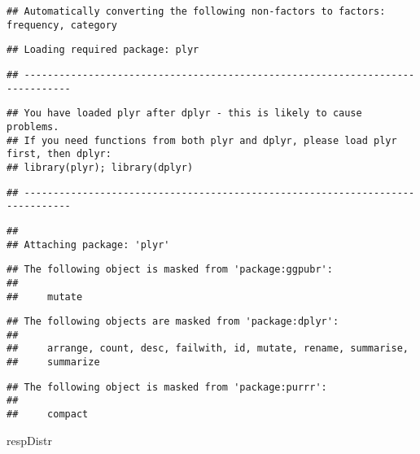 \documentclass[
]{article}
\newenvironment{Shaded}{\begin{snugshade}}{\end{snugshade}}
\newcommand{\NormalTok}[1]{#1}
\begin{document}
\begin{verbatim}
## Automatically converting the following non-factors to factors: frequency, category
\end{verbatim}

\begin{verbatim}
## Loading required package: plyr
\end{verbatim}

\begin{verbatim}
## ------------------------------------------------------------------------------
\end{verbatim}

\begin{verbatim}
## You have loaded plyr after dplyr - this is likely to cause problems.
## If you need functions from both plyr and dplyr, please load plyr first, then dplyr:
## library(plyr); library(dplyr)
\end{verbatim}

\begin{verbatim}
## ------------------------------------------------------------------------------
\end{verbatim}

\begin{verbatim}
## 
## Attaching package: 'plyr'
\end{verbatim}

\begin{verbatim}
## The following object is masked from 'package:ggpubr':
## 
##     mutate
\end{verbatim}

\begin{verbatim}
## The following objects are masked from 'package:dplyr':
## 
##     arrange, count, desc, failwith, id, mutate, rename, summarise,
##     summarize
\end{verbatim}

\begin{verbatim}
## The following object is masked from 'package:purrr':
## 
##     compact
\end{verbatim}

\begin{Shaded}
\begin{Highlighting}[]
\NormalTok{respDistr}
\end{Highlighting}
\end{Shaded}
\end{document}
